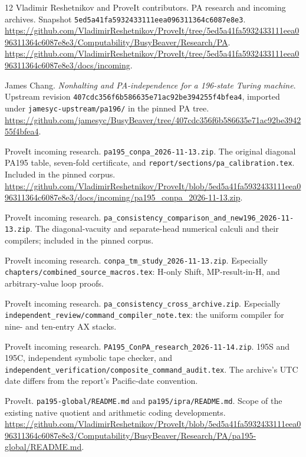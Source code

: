 \documentclass[11pt,letterpaper]{article}
\newcommand{\file}[1]{\texttt{\nolinkurl{#1}}}
\begin{document}
\clearpage


\clearpage
\begin{thebibliography}{12}
Vladimir Reshetnikov and ProveIt contributors. PA research and incoming
archives. Snapshot \file{5ed5a41fa5932433111eea096311364c6087e8e3}.
\url{https://github.com/VladimirReshetnikov/ProveIt/tree/5ed5a41fa5932433111eea096311364c6087e8e3/Computability/BusyBeaver/Research/PA}.
\url{https://github.com/VladimirReshetnikov/ProveIt/tree/5ed5a41fa5932433111eea096311364c6087e8e3/docs/incoming}.

James Chang. \emph{Nonhalting and PA-independence for a 196-state Turing
machine}. Upstream revision \file{407cdc356f6b586635e71ac92be394255f4bfea4},
imported under \file{jamesyc-upstream/pa196/} in the pinned PA tree.
\url{https://github.com/jamesyc/BusyBeaver/tree/407cdc356f6b586635e71ac92be394255f4bfea4}.

ProveIt incoming research. \file{pa195_conpa_2026-11-13.zip}.
The original diagonal PA195 table, seven-fold certificate, and
\file{report/sections/pa_calibration.tex}. Included in the pinned corpus.
\url{https://github.com/VladimirReshetnikov/ProveIt/blob/5ed5a41fa5932433111eea096311364c6087e8e3/docs/incoming/pa195_conpa_2026-11-13.zip}.

ProveIt incoming research.
\file{pa_consistency_comparison_and_new196_2026-11-13.zip}.
The diagonal-vacuity and separate-head numerical calculi and their
compilers; included in the pinned corpus.

ProveIt incoming research. \file{conpa_tm_study_2026-11-13.zip}.
Especially \file{chapters/combined_source_macros.tex}: H-only Shift,
MP-result-in-H, and arbitrary-value loop proofs.

ProveIt incoming research. \file{pa_consistency_cross_archive.zip}.
Especially \file{independent_review/command_compiler_note.tex}: the
uniform compiler for nine- and ten-entry AX stacks.

ProveIt incoming research. \file{PA195_ConPA_research_2026-11-14.zip}.
195S and 195C, independent symbolic tape checker, and
\file{independent_verification/composite_command_audit.tex}.
The archive's UTC date differs from the report's Pacific-date convention.

ProveIt. \file{pa195-global/README.md} and \file{pa195/ipra/README.md}.
Scope of the existing native quotient and arithmetic coding developments.
\url{https://github.com/VladimirReshetnikov/ProveIt/blob/5ed5a41fa5932433111eea096311364c6087e8e3/Computability/BusyBeaver/Research/PA/pa195-global/README.md}.


\end{thebibliography}
\end{document}
